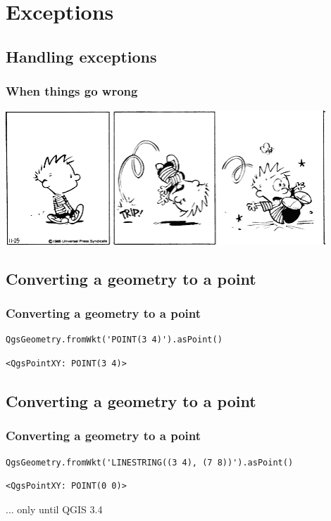 \section{Exceptions}

\subsection{Handling exceptions}

\begin{frame}
\frametitle{When things go wrong}
	\includegraphics[width=0.9\textwidth]{img/calvin.png}
\end{frame}

\subsection{Converting a geometry to a point}
\begin{frame}[fragile]
\frametitle{Converting a geometry to a point}

\begin{lstlisting}[style=pythoncode]
QgsGeometry.fromWkt('POINT(3 4)').asPoint()
\end{lstlisting}
\pause
\begin{lstlisting}[style=pythonoutput]
<QgsPointXY: POINT(3 4)>
\end{lstlisting}

\end{frame}

\subsection{Converting a geometry to a point}
\begin{frame}[fragile]
\frametitle{Converting a geometry to a point}

\begin{lstlisting}[style=pythoncode]
QgsGeometry.fromWkt('LINESTRING((3 4), (7 8))').asPoint()
\end{lstlisting}
\pause
\begin{lstlisting}[style=pythonoutput]
<QgsPointXY: POINT(0 0)>
\end{lstlisting}
\pause
... only until QGIS 3.4
\end{frame}

